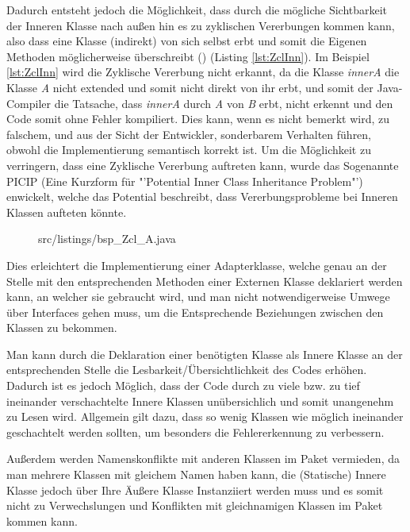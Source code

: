 Dadurch entsteht jedoch die Möglichkeit, dass durch die mögliche Sichtbarkeit der Inneren Klasse nach außen hin es zu zyklischen Vererbungen kommen kann, also dass eine Klasse (indirekt) von sich selbst erbt und somit die Eigenen Methoden möglicherweise überschreibt (\cite{DBLP:journals/corr/abs-1301-6260}) (Listing \ref{lst:ZclInn}).
Im Beispiel \ref{lst:ZclInn}  wird die Zyklische Vererbung nicht erkannt, da die Klasse {\it innerA} die Klasse {\it A} nicht extended und somit nicht direkt von ihr erbt, und somit der Java-Compiler die Tatsache, dass {\it innerA} durch {\it A} von {\it B} erbt, nicht erkennt und den Code somit ohne Fehler kompiliert.
Dies kann, wenn es nicht bemerkt wird, zu falschem, und aus der Sicht der Entwickler, sonderbarem Verhalten führen, obwohl die Implementierung semantisch korrekt ist.
Um die Möglichkeit zu verringern, dass eine Zyklische Vererbung auftreten kann, wurde das Sogenannte PICIP (Eine Kurzform für "'Potential Inner Class Inheritance Problem"') enwickelt, welche das Potential beschreibt, dass Vererbungsprobleme bei Inneren Klassen aufteten könnte.

\begin{figure}[hbt]
\lstset{language=Java}
 {src/listings/bsp_Zcl_A.java}
\end{figure}
\newpage

Dies erleichtert die Implementierung einer Adapterklasse, welche genau an der Stelle mit den entsprechenden Methoden einer Externen Klasse deklariert werden kann, an welcher sie gebraucht wird, und man nicht notwendigerweise Umwege über Interfaces gehen muss, um die Entsprechende Beziehungen zwischen den Klassen zu bekommen.

Man kann durch die Deklaration einer benötigten Klasse als Innere Klasse an der entsprechenden Stelle die Lesbarkeit/Übersichtlichkeit des Codes erhöhen.
Dadurch ist es jedoch Möglich, dass der Code durch zu viele bzw. zu tief ineinander verschachtelte Innere Klassen unübersichlich und somit unangenehm zu Lesen wird. Allgemein gilt dazu, dass so wenig Klassen wie möglich ineinander geschachtelt werden sollten, um besonders die Fehlererkennung zu verbessern.

Außerdem werden Namenskonflikte mit anderen Klassen im Paket vermieden, da man mehrere Klassen mit gleichem Namen haben kann, die (Statische) Innere Klasse jedoch über Ihre Äußere Klasse Instanziiert werden muss und es somit nicht zu Verwechslungen und Konflikten mit gleichnamigen Klassen im Paket kommen kann.

